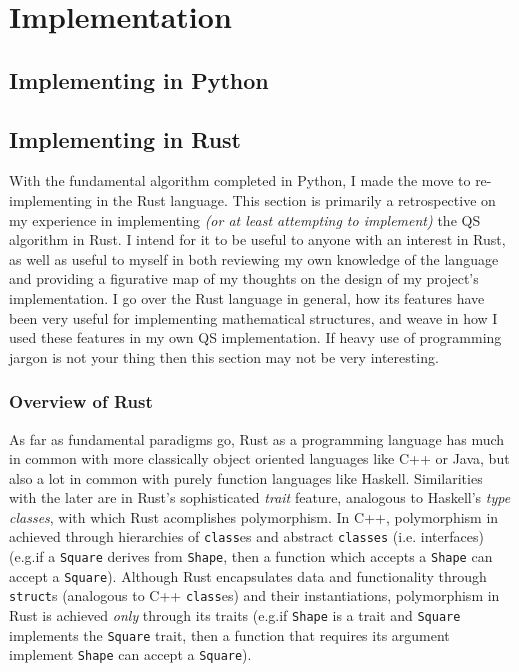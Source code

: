 \documentclass{report}
\begin{document}
\chapter{Implementation}

\section{Implementing in Python}

\section{Implementing in Rust}

With the fundamental algorithm completed in Python, I made the move to
re-implementing in the Rust language. This section is primarily a
retrospective on my experience in implementing \emph{(or at least
attempting to implement)} the QS algorithm in Rust.
I intend for it to be useful to anyone with an interest in Rust, as well as
useful to myself in both reviewing my own knowledge of the language and
providing a figurative map of my thoughts on the design of my project's
implementation.
I go over the Rust language
in general, how its features have been very useful for implementing mathematical
structures, and weave in how I used these features in my own QS implementation.
If heavy use of programming jargon is not your thing then this section may not
be very interesting.

\subsection{Overview of Rust}\label{s:rust-overview}

As far as fundamental paradigms go, Rust as a programming language has much in
common with more classically object oriented languages like C++ or Java, but
also a lot in common with purely function languages like Haskell.
Similarities with the later are in Rust's sophisticated \emph{trait} feature,
analogous to Haskell's \emph{type classes}, with which Rust acomplishes
polymorphism.
In C++, polymorphism in achieved through hierarchies of \Verb+class+es and
abstract \Verb+classes+ (i.e. interfaces)
(e.g.\@ if a \Verb+Square+ derives from \Verb+Shape+, then a function which
accepts a \Verb+Shape+ can accept a \Verb+Square+).
Although Rust encapsulates data and functionality through \Verb+struct+s
(analogous to C++ \Verb+class+es) and their instantiations,
polymorphism in Rust is achieved \emph{only} through its traits
(e.g.\@ if \Verb+Shape+ is a trait and \Verb+Square+ implements the \Verb+Square+
trait, then a function that requires its argument implement \Verb+Shape+ can
accept a \Verb+Square+).
\end{document}
